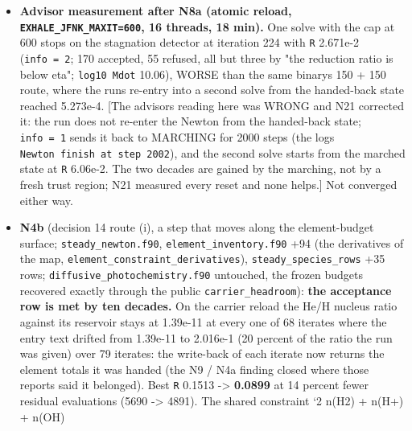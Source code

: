 \documentclass[english,a4paper]{my_memo}
\begin{document}
\begin{itemize}
  width now on \texttt{state\_column\_scale}); the \texttt{{[}diag\ 4{]}} true-residual row is
  not valid for long steps (its finite-difference product is out of range).
  The fixture README updated by the advisor.
\item
  \textbf{Advisor measurement after N8a (atomic reload, \texttt{EXHALE\_JFNK\_MAXIT=600},
  16 threads, 18 min).} One solve with the cap at 600 stops on the
  stagnation detector at iteration 224 with \texttt{\textbar{}\textbar{}R\textbar{}\textbar{}} 2.671e-2 (\texttt{info\ =\ 2};
  170 accepted, 55 refused, all but three by "the reduction ratio is below
  eta"; \texttt{log10\ Mdot} 10.06), WORSE than the same binary\textquotesingle s 150 + 150 route,
  where the run\textquotesingle s re-entry into a second solve from the handed-back state
  reached 5.273e-4. {[}The advisor\textquotesingle s reading here was WRONG and N21 corrected it: the
  run does not re-enter the Newton from the handed-back state; \texttt{info\ =\ 1}
  sends it back to MARCHING for 2000 steps (the log\textquotesingle s \texttt{Newton\ finish\ at\ step\ 2002}), and the second solve starts from the marched state at
  \texttt{\textbar{}\textbar{}R\textbar{}\textbar{}} 6.06e-2. The two decades are gained by the marching, not by a
  fresh trust region; N21 measured every reset and none helps.{]} Not
  converged either way.
\item
  \textbf{N4b} (decision 14 route (i), a step that moves along the element-budget
  surface; \texttt{steady\_newton.f90}, \texttt{element\_inventory.f90} +94 (the
  derivatives of the map, \texttt{element\_constraint\_derivatives}),
  \texttt{steady\_species\_rows} +35 rows; \texttt{diffusive\_photochemistry.f90} untouched,
  the frozen budgets recovered exactly through the public
  \texttt{carrier\_headroom}): \textbf{the acceptance row is met by ten decades.} On the
  carrier reload the He/H nucleus ratio against its reservoir stays at
  1.39e-11 at every one of 68 iterates where the entry text drifted from
  1.39e-11 to 2.016e-1 (20 percent of the ratio the run was given) over 79
  iterates: the write-back of each iterate now returns the element totals
  it was handed (the N9 / N4a finding closed where those reports said it
  belonged). Best \texttt{\textbar{}\textbar{}R\textbar{}\textbar{}} 0.1513 -\textgreater{} \textbf{0.0899} at 14 percent fewer residual
  evaluations (5690 -\textgreater{} 4891). The shared constraint `2 n(H2) + n(H+) + n(OH)


\end{itemize}
\end{document}

